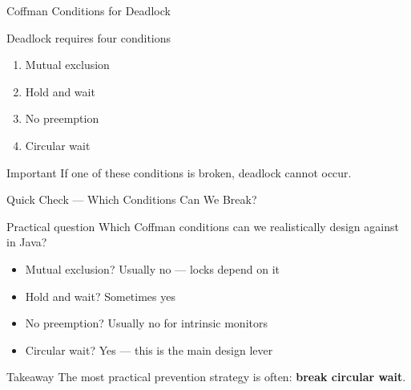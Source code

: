 \documentclass[aspectratio=169,11pt]{beamer}
\begin{document}
	\begin{frame}{Coffman Conditions for Deadlock}
		\begin{block}{Deadlock requires four conditions}
			\begin{enumerate}
				\item Mutual exclusion
				\item Hold and wait
				\item No preemption
				\item Circular wait
			\end{enumerate}
		\end{block}
		
		\bigskip
		
		\begin{alertblock}{Important}
			If one of these conditions is broken, deadlock cannot occur.
		\end{alertblock}
	\end{frame}
	
	\begin{frame}{Quick Check --- Which Conditions Can We Break?}
		\begin{block}{Practical question}
			Which Coffman conditions can we realistically design against in Java?
		\end{block}
		
		\bigskip
		
		\begin{itemize}
			\item Mutual exclusion? Usually no --- locks depend on it
			\item Hold and wait? Sometimes yes
			\item No preemption? Usually no for intrinsic monitors
			\item Circular wait? Yes --- this is the main design lever
		\end{itemize}
		
		\bigskip
		
		\begin{alertblock}{Takeaway}
			The most practical prevention strategy is often: \textbf{break circular wait}.
		\end{alertblock}
	\end{frame}
	
\end{document}
